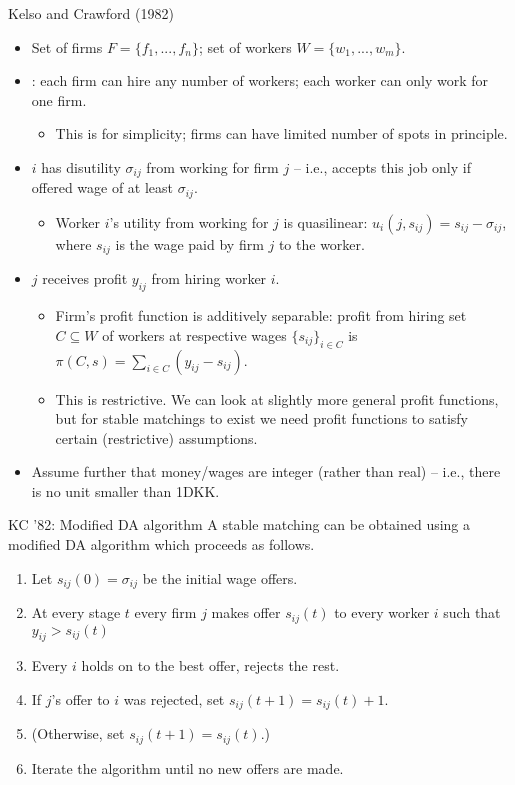 \documentclass[english,10pt
,aspectratio=169
]{beamer}
\begin{document}
\begin{frame}{Kelso and Crawford (1982)}
\begin{itemize}
	\item Set of firms $F = \{f_1, ..., f_n\}$; set of workers $W = \{w_1, ..., w_m\}$.
	\item {}: each firm can hire any number of workers; each worker can only work for one firm.
	\begin{itemize}
		\item This is for simplicity; firms can have limited number of spots in principle.
	\end{itemize}
	\item {} $i$ has disutility $\sigma_{ij}$ from working for firm $j$ -- i.e., accepts this job only if offered wage of at least $\sigma_{ij}$.
	\begin{itemize}
		\item Worker $i$'s utility from working for $j$ is quasilinear: \alert{$u_i(j,s_{ij}) = s_{ij} - \sigma_{ij}$}, where $s_{ij}$ is the wage paid by firm $j$ to the worker.
	\end{itemize}
	\item {} $j$ receives profit $y_{ij}$ from hiring worker $i$.
	\begin{itemize}
		\item Firm's profit function is additively separable: profit from hiring set $C \subseteq W$ of workers at respective wages $\{s_{ij}\}_{i \in C}$ is \alert{$\pi(C,s) = \sum_{i \in C} (y_{ij} - s_{ij})$}.
		\item This is \alert{restrictive}. We can look at slightly more general profit functions, but for stable matchings to exist we need profit functions to satisfy certain (restrictive) assumptions.
	\end{itemize}
	\item Assume further that money/wages are integer (rather than real) -- i.e., there is no unit smaller than 1DKK.
\end{itemize}
\end{frame}


\begin{frame}{KC '82: Modified DA algorithm}
A stable matching can be obtained using a modified DA algorithm which proceeds as follows.
	\begin{enumerate}
		\item Let $s_{ij}(0) = \sigma_{ij}$ be the initial wage offers.
		\item At every stage $t$ every firm $j$ makes offer $s_{ij}(t)$ to every worker $i$ such that $y_{ij} > s_{ij}(t)$
		\item Every $i$ holds on to the best offer, rejects the rest.
		\item If $j$'s offer to $i$ was rejected, set $s_{ij}(t+1) = s_{ij}(t) + 1$.
		\item (Otherwise, set $s_{ij}(t+1) = s_{ij}(t)$.)
		\item Iterate the algorithm until no new offers are made.
	\end{enumerate}
\end{frame}
\end{document}
